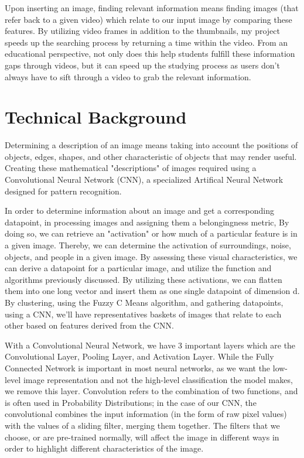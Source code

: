 \documentclass[10pt,twocolumn]{article}
\begin{document}
Upon inserting an image, finding relevant information means finding images (that refer back to a given video) which relate to our input image by comparing these features. By utilizing video frames in addition to the thumbnails, my project speeds up the searching process by returning a time within the video. From an educational perspective, not only does this help students fulfill these information gaps through videos, but it can speed up the studying process as users don’t always have to sift through a video to grab the relevant information.

\section{Technical Background} 

Determining a description of an image means taking into account the positions of objects, edges, shapes, and other characteristic of objects that may render useful. Creating these mathematical "descriptions" of images required using a Convolutional Neural Network (CNN), a specialized Artifical Neural Network designed for pattern recognition. 

In order to determine information about an image and get a corresponding datapoint, in processing images and assigning them a belongingness metric, By doing so, we can retrieve an "activation" or how much of a particular feature is in a given image. Thereby, we can determine the activation of surroundings, noise, objects, and people in a given image. By assessing these visual characteristics, we can derive a datapoint for a particular image, and utilize the function and algorithms previously discussed. By utilizing these activations, we can flatten them into one long vector and insert them as one single datapoint of dimension d. By clustering, using the Fuzzy C Means algorithm, and gathering datapoints, using a CNN, we'll have representatives baskets of images that relate to each other based on features derived from the CNN. 

With a Convolutional Neural Network, we have 3 important layers which are the Convolutional Layer, Pooling Layer, and Activation Layer. While the Fully Connected Network is important in most neural networks, as we want the low-level image representation and not the high-level classification the model makes, we remove this layer. Convolution refers to the combination of two functions, and is often used in Probability Distributions; in the case of our CNN, the convolutional combines the input information (in the form of raw pixel values) with the values of a sliding filter, merging them together. The filters that we choose, or are pre-trained normally, will affect the image in different ways in order to highlight different characteristics of the image. 
\end{document}
